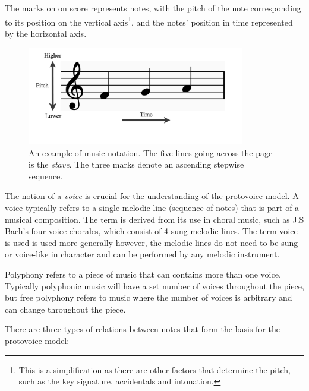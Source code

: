 \documentclass[12pt,a4paper,twoside,openright]{report}
\theoremstyle{definition}
\begin{document}
The marks on on score represents notes, with the pitch of the note corresponding to its position on the vertical axis\footnote{This is a simplification as there are other factors that determine the pitch, such as the key signature, accidentals and intonation.}, and the notes' position in time represented by the horizontal axis.
\begin{figure}
  \centering
  \includegraphics[width=0.85\textwidth]{prep/pitchTime.png}
  \captionsetup{width=.9\linewidth}
  \caption{An example of music notation. The five lines going across the page is the \textit{stave}. The three marks denote an ascending stepwise sequence.}
  \label{fig:pitchTime}
\end{figure}

The notion of a \textit{voice} is crucial for the understanding of the protovoice model. A voice typically refers to a single melodic line (sequence of notes) that is part of a musical composition. The term is derived from its use in choral music, such as J.S Bach's four-voice chorales, which consist of 4 sung melodic lines. The term voice is used is used more generally however, the melodic lines do not need to be sung or voice-like in character and can be performed by any melodic instrument. 
\FloatBarrier
\par
Polyphony refers to a piece of music that can contains more than one voice. Typically polyphonic music will have a set number of voices throughout the piece, but free polyphony refers to music where the number of voices is arbitrary and can change throughout the piece.
\par
There are three types of relations between notes that form the basis for the protovoice model:
\end{document}
